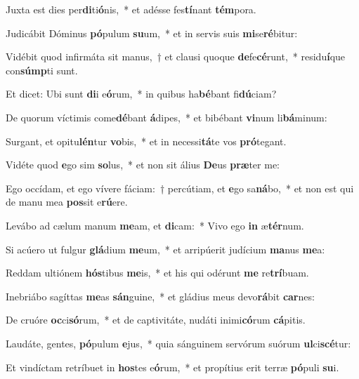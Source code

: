 \item Juxta est dies per\textbf{di}ti\textbf{ó}nis,~* et adésse fes\textbf{tí}nant \textbf{tém}pora.
\item Judicábit Dóminus \textbf{pó}pulum \textbf{su}um,~* et in servis suis \textbf{mi}se\textbf{ré}bitur:
\item Vidébit quod infirmáta sit manus,~† et clausi quoque \textbf{de}fe\textbf{cé}runt,~* residu\textbf{í}que con\textbf{súmp}ti sunt.
\item Et dicet: Ubi sunt \textbf{di}i e\textbf{ó}rum,~* in quibus ha\textbf{bé}bant fi\textbf{dú}ciam?
\item De quorum víctimis come\textbf{dé}bant \textbf{á}dipes,~* et bibébant \textbf{vi}num li\textbf{bá}minum:
\item Surgant, et opitu\textbf{lén}tur \textbf{vo}bis,~* et in necessi\textbf{tá}te vos \textbf{pró}tegant.
\item Vidéte quod \textbf{e}go sim \textbf{so}lus,~* et non sit álius \textbf{De}us \textbf{præ}ter me:
\item Ego occídam, et ego vívere fáciam:~† percútiam, et \textbf{e}go sa\textbf{ná}bo,~* et non est qui de manu mea \textbf{pos}sit e\textbf{rú}ere.
\item Levábo ad cælum manum \textbf{me}am, et \textbf{di}cam:~* Vivo ego \textbf{in} æ\textbf{tér}num.
\item Si acúero ut fulgur \textbf{glá}dium \textbf{me}um,~* et arripúerit judícium \textbf{ma}nus \textbf{me}a:
\item Reddam ultiónem \textbf{hós}tibus \textbf{me}is,~* et his qui odérunt \textbf{me} re\textbf{trí}buam.
\item Inebriábo sagíttas \textbf{me}as \textbf{sán}guine,~* et gládius meus devo\textbf{rá}bit \textbf{car}nes:
\item De cruóre \textbf{oc}ci\textbf{só}rum,~* et de captivitáte, nudáti inimi\textbf{có}rum \textbf{cá}pitis.
\item Laudáte, gentes, \textbf{pó}pulum \textbf{e}jus,~* quia sánguinem servórum suórum \textbf{ul}ci\textbf{scé}tur:
\item Et vindíctam retríbuet in \textbf{hos}tes e\textbf{ó}rum,~* et propítius erit terræ \textbf{pó}puli \textbf{su}i.
